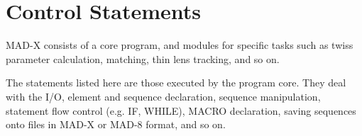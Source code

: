 

%
%
%
%


\section{Control Statements}
MAD-X consists of a core program, and modules for specific tasks such as
twiss parameter calculation, matching, thin lens tracking, and so on.  
 
The statements listed here are those executed by the program core. They
deal with the I/O, element and sequence declaration, sequence
manipulation, statement flow control (e.g. IF, WHILE), MACRO
declaration, saving sequences onto files in MAD-X or MAD-8 format, and
so on.  



